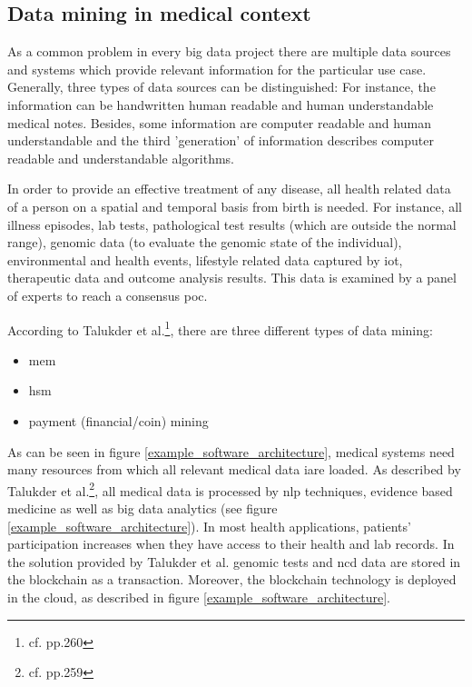 \subsection{Data mining in medical context}

As a common problem in every big data project there are multiple data sources and systems which provide relevant information for the particular use case. Generally, three types of data sources can be distinguished: For instance, the information can be handwritten human readable and human understandable medical notes. Besides, some information are computer readable and human understandable and the third 'generation' of information describes computer readable and understandable algorithms.

In order to provide an effective treatment of any disease, all health related data of a person on a spatial and temporal basis from birth is needed. For instance, all illness episodes, lab tests, pathological test results (which are outside the normal range), genomic data (to evaluate the genomic state of the individual), environmental and health events, lifestyle related data captured by \ac{iot}, therapeutic data and outcome analysis results.
This data is examined by a panel of experts to reach a consensus \ac{poc}.

According to Talukder et al.\footnote{cf.\autocite{talukder} pp.260}, there are three different types of data mining: 

\begin{itemize}
\setlength\itemsep{-0.5em}
  \item \ac{mem}
  \item \ac{hsm} 
  \item payment (financial/coin) mining
\end{itemize}

As can be seen in figure \ref{example_software_architecture}, medical systems need many resources from which all relevant medical data iare loaded. As described by Talukder et al.\footnote{cf.\autocite{talukder} pp.259}, all medical data is processed by \ac{nlp} techniques, evidence based medicine as well as big data analytics (see figure \ref{example_software_architecture}).
In most health applications, patients' participation increases when they have access to their health and lab records. In the solution provided by Talukder et al. genomic tests and \ac{ncd} data are stored in the blockchain as a transaction.
Moreover, the blockchain technology is deployed in the cloud, as described in figure \ref{example_software_architecture}.

